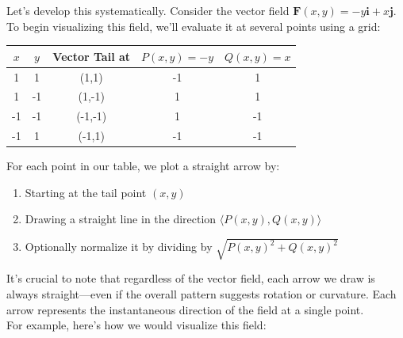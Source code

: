 \noindent Let's develop this systematically. Consider the vector field $\mathbf{F}(x,y) = -y\mathbf{i} + x\mathbf{j}$. To begin visualizing this field, we'll evaluate it at several points using a grid:

\begin{center}
\begin{tabular}{|c|c||c|c|c|}
\hline
$x$ & $y$ & Vector Tail at & $P(x,y) = -y$ & $Q(x,y) = x$ \\
\hline
1 & 1 & (1,1) & -1 & 1 \\
1 & -1 & (1,-1) & 1 & 1 \\
-1 & -1 & (-1,-1) & 1 & -1 \\
-1 & 1 & (-1,1) & -1 & -1 \\
\hline
\end{tabular}
\end{center}

\noindent For each point in our table, we plot a straight arrow by:
\begin{enumerate}
   \item Starting at the tail point $(x,y)$
   \item Drawing a straight line in the direction $\langle P(x,y), Q(x,y) \rangle$
   \item Optionally normalize it by dividing by $\sqrt{P(x,y)^2 + Q(x,y)^2}$
\end{enumerate}

\noindent It's crucial to note that regardless of the vector field, each arrow we draw is always straight—even if the overall pattern suggests rotation or curvature. Each arrow represents the instantaneous direction of the field at a single point. \\

\noindent For example, here's how we would visualize this field:

\begin{center}
\end{center}

